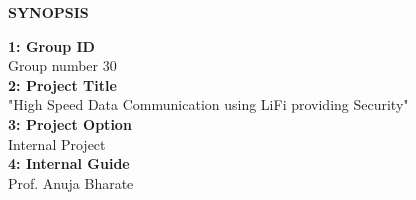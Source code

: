 \documentclass[12pt]{report}	%
\begin{document}
	\fancypage{\setlength{\fboxsep}{10pt}\doublebox}{}	
		\begin{center}
		{ \large\bf  SYNOPSIS }\\
		\end{center} 

{\large\textbf{1: Group ID}}\\
{\small  Group number  30}\\


{\large\textbf{2: Project Title}}\\
{\small  "High Speed Data Communication using LiFi providing Security"}\\


{\large\textbf{3: Project Option}}\\
{\small Internal Project }\\


{\large\textbf{4: Internal Guide}}\\
{\small Prof. Anuja Bharate} \\
\end{document}
